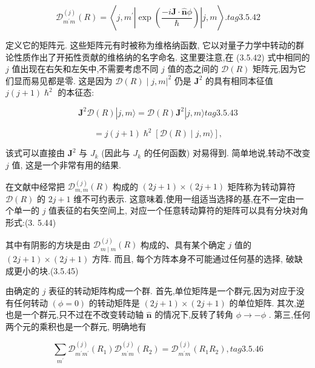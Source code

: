 $$
{\mathcal{D}}_{{m}^{\prime }m}^{\left( j\right) }\left( R\right) = \left\langle {j,{m}^{\prime }\left| {\exp \left( \frac{-i\mathbf{J} \cdot \widehat{\mathbf{n}}\phi }{\hslash }\right) }\right| j, m}\right\rangle . tag{3. 5.42}
$$

定义它的矩阵元. 这些矩阵元有时被称为维格纳函数, 它以对量子力学中转动的群论性质作出了开拓性贡献的维格纳的名字命名. 这里要注意,在 (3.5.42) 式中相同的 $j$ 值出现在右矢和左矢中,不需要考虑不同 $j$ 值的态之间的 $\mathcal{D}\left( R\right)$ 矩阵元,因为它们显而易见都是零. 这是因为 ${\left. \mathcal{D}\left( R\right) \mid j, m\right| }^{2}$ 仍是 ${\mathbf{J}}^{2}$ 的具有相同本征值 $j\left( {j + 1}\right) {\hslash }^{2}$ 的本征态:

$$
{\mathbf{J}}^{2}\mathcal{D}\left( R\right) \left| {j, m\rangle = \mathcal{D}\left( R\right) {\mathbf{J}}^{2}}\right| j, m\rangle tag{3. 5.43}
$$

$$
= j\left( {j + 1}\right) {\hslash }^{2}\left\lbrack {\mathcal{D}\left( R\right) \mid j, m\rangle }\right\rbrack ,
$$

该式可以直接由 ${\mathbf{J}}^{2}$ 与 ${J}_{k}$ (因此与 ${J}_{k}$ 的任何函数) 对易得到. 简单地说,转动不改变 $j$ 值, 这是一个非常有用的结果.

在文献中经常把 ${\mathcal{D}}_{m, m}^{\left( j\right) }\left( R\right)$ 构成的 $\left( {{2j} + 1}\right) \times \left( {{2j} + 1}\right)$ 矩阵称为转动算符 $\mathcal{D}\left( R\right)$ 的 ${2j} + 1$ 维不可约表示. 这意味着,使用一组适当选择的基,在不一定由一个单一的 $j$ 值表征的右矢空间上, 对应一个任意转动算符的矩阵可以具有分块对角形式:(3. 5.44)


其中有阴影的方块是由 ${\mathcal{D}}_{m \mid m}^{\left( j\right) }\left( R\right)$ 构成的、具有某个确定 $j$ 值的 $\left( {{2j} + 1}\right) \times \left( {{2j} + 1}\right)$ 方阵. 而且, 每个方阵本身不可能通过任何基的选择, 破缺成更小的块.(3.5.45)



由确定的 $j$ 表征的转动矩阵构成一个群. 首先,单位矩阵是一个群元,因为对应于没有任何转动 $\left( {\phi = 0}\right)$ 的转动矩阵是 $\left( {{2j} + 1}\right) \times \left( {{2j} + 1}\right)$ 的单位矩阵. 其次,逆也是一个群元,只不过在不改变转动轴 $\widehat{\mathbf{n}}$ 的情况下,反转了转角 $\phi \rightarrow - \phi$ . 第三,任何两个元的乘积也是一个群元, 明确地有

$$
\mathop{\sum }\limits_{{m}^{\prime }}{\mathcal{D}}_{{m}^{\prime }{m}^{\prime }}^{\left( j\right) }\left( {R}_{1}\right) {\mathcal{D}}_{{m}^{\prime }m}^{\left( j\right) }\left( {R}_{2}\right) = {\mathcal{D}}_{{m}^{\prime }m}^{\left( j\right) }\left( {{R}_{1}{R}_{2}}\right) , tag{3. 5.46}
$$

